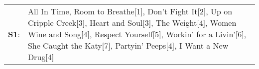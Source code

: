 \begin{supertabular}{p{0.03\textwidth}p{0.92\textwidth}}
 \textbf{S1}:  &  All In Time\textsuperscript{}, \enspace Room to Breathe[1]\textsuperscript{}, \enspace Don't Fight It[2]\textsuperscript{}, \enspace Up on Cripple Creek[3]\textsuperscript{}, \enspace Heart and Soul[3]\textsuperscript{}, \enspace The Weight[4]\textsuperscript{}, \enspace Women Wine and Song[4]\textsuperscript{}, \enspace Respect Yourself[5]\textsuperscript{}, \enspace Workin' for a Livin'[6]\textsuperscript{}, \enspace She Caught the Katy[7]\textsuperscript{}, \enspace Partyin' Peeps[4]\textsuperscript{}, \enspace I Want a New Drug[4]\textsuperscript{}  \enspace  \\
\end{supertabular}
